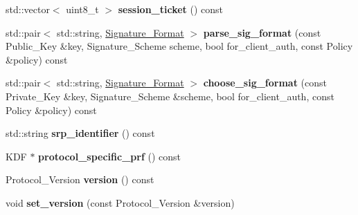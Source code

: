 \begin{DoxyCompactItemize}
\item 
\mbox{\label{class_botan_1_1_t_l_s_1_1_handshake___state_a5ca53dc2dbf0ea46bd7b6cad2c89cf30}} 
std\+::vector$<$ uint8\+\_\+t $>$ {\bfseries session\+\_\+ticket} () const
\item 
\mbox{\label{class_botan_1_1_t_l_s_1_1_handshake___state_a9b0e1084ed54f66b6477cd5a27edcf02}} 
std\+::pair$<$ std\+::string, \mbox{\hyperlink{namespace_botan_ad8a9578625edf847cbcba3ae15648cda}{Signature\+\_\+\+Format}} $>$ {\bfseries parse\+\_\+sig\+\_\+format} (const Public\+\_\+\+Key \&key, Signature\+\_\+\+Scheme scheme, bool for\+\_\+client\+\_\+auth, const Policy \&policy) const
\item 
\mbox{\label{class_botan_1_1_t_l_s_1_1_handshake___state_afb1f7ce7720cb2fe51e7cd67b08ead32}} 
std\+::pair$<$ std\+::string, \mbox{\hyperlink{namespace_botan_ad8a9578625edf847cbcba3ae15648cda}{Signature\+\_\+\+Format}} $>$ {\bfseries choose\+\_\+sig\+\_\+format} (const Private\+\_\+\+Key \&key, Signature\+\_\+\+Scheme \&scheme, bool for\+\_\+client\+\_\+auth, const Policy \&policy) const
\item 
\mbox{\label{class_botan_1_1_t_l_s_1_1_handshake___state_a263e1320b24cec6959619aa64553c6a2}} 
std\+::string {\bfseries srp\+\_\+identifier} () const
\item 
\mbox{\label{class_botan_1_1_t_l_s_1_1_handshake___state_a0e970bcde7c82f199418689b189fa42e}} 
K\+DF $\ast$ {\bfseries protocol\+\_\+specific\+\_\+prf} () const
\item 
\mbox{\label{class_botan_1_1_t_l_s_1_1_handshake___state_afed87dce732744b1c9a46232332e6b61}} 
Protocol\+\_\+\+Version {\bfseries version} () const
\item 
\mbox{\label{class_botan_1_1_t_l_s_1_1_handshake___state_ab9ff8d74a9f3b3790e2acd3ed4a8fec9}} 
void {\bfseries set\+\_\+version} (const Protocol\+\_\+\+Version \&version)
\item 
\mbox{\label{class_botan_1_1_t_l_s_1_1_handshake___state_a214f2d902e11a557c52fa5d950806dd1}} 

\end{DoxyCompactItemize}
